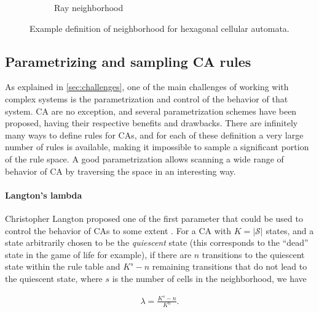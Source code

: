 \begin{figure}[htbp]
\begin{subfigure}[b]{.35\linewidth}
    \caption{Ray neighborhood}
    \label{fig:hexagonal_2}
  \end{subfigure}
  \caption{Example definition of neighborhood for hexagonal cellular automata.}
\label{fig:hexagonal}
\end{figure}


\subsection{Parametrizing and sampling CA rules}
As explained in \ref{sec:challenges}, one of the main challenges of working with
complex systems is the parametrization and control of the behavior of that
system. \ac{CA} are no exception, and several parametrization schemes have been
proposed, having their respective benefits and drawbacks. There are infinitely
many ways to define rules for \acp{CA}, and for each of these definition a very
large number of rules is available, making it impossible to sample a significant
portion of the rule space. A good parametrization allows scanning a wide range
of behavior of \ac{CA} by traversing the space in an interesting way.

\paragraph{Langton's lambda}

Christopher Langton proposed one of the first parameter that could be used to
control the behavior of \acp{CA} to some extent
\parencite{langtonStudyingArtificialLife1986, langtonComputationEdgeChaos1990}.
For a \ac{CA} with $K = |\mathcal{S}|$ states, and a state arbitrarily chosen to be
the \emph{quiescent} state (this corresponds to the ``dead'' state in the game
of life for example), if there are $n$ transitions to the quiescent state within
the rule table and $K^{s} - n$ remaining transitions that do not lead to the
quiescent state, where $s$ is the number of cells in the neighborhood, we
have

\begin{equation}
  \label{eq:langton}
  \begin{aligned}
    \lambda = \frac{K^{s} - n}{K^{n}}.
  \end{aligned}
\end{equation}

